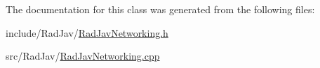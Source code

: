 The documentation for this class was generated from the following files\+:\begin{DoxyCompactItemize}
\item 
include/\+Rad\+Jav/\mbox{\hyperlink{_rad_jav_networking_8h}{Rad\+Jav\+Networking.\+h}}\item 
src/\+Rad\+Jav/\mbox{\hyperlink{_rad_jav_networking_8cpp}{Rad\+Jav\+Networking.\+cpp}}\end{DoxyCompactItemize}
